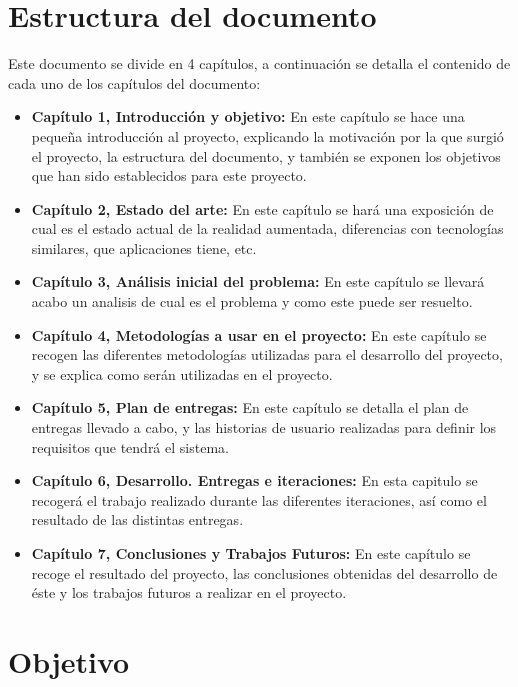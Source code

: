 \section{Estructura del documento}
Este documento se divide en 4 capítulos, a continuación se detalla el contenido de cada uno de los capítulos del documento:
\begin{itemize}
  \item \textbf{Capítulo 1, Introducción y objetivo:} En este capítulo se hace una pequeña introducción al proyecto, explicando la motivación por la que surgió el proyecto, la estructura del documento, y también se exponen los objetivos que han sido establecidos para este proyecto.
  \item \textbf{Capítulo 2, Estado del arte:} En este capítulo se hará una exposición de cual es el estado actual de la realidad aumentada, diferencias con tecnologías similares, que aplicaciones tiene, etc.
  \item \textbf{Capítulo 3, Análisis inicial del problema:} En este capítulo se llevará acabo un analisis de cual es el problema y como este puede ser resuelto.
  \item \textbf{Capítulo 4, Metodologías a usar en el proyecto:} En este capítulo se recogen las diferentes metodologías utilizadas para el desarrollo del proyecto, y se explica como serán utilizadas en el proyecto.
  \item \textbf{Capítulo 5, Plan de entregas:} En este capítulo se detalla el plan de entregas llevado a cabo, y las historias de usuario realizadas para definir los requisitos que tendrá el sistema.
  \item \textbf{Capítulo 6, Desarrollo. Entregas e iteraciones:} En esta capitulo se recogerá el trabajo realizado durante las diferentes iteraciones, así como el resultado de las distintas entregas.
  \item \textbf{Capítulo 7, Conclusiones y Trabajos Futuros:} En este capítulo se recoge el resultado del proyecto, las conclusiones obtenidas del desarrollo de éste y los trabajos futuros a realizar en el proyecto.
\end{itemize}

\section{Objetivo}
